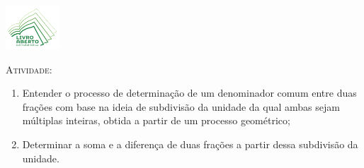 \documentclass[10 pt,usenames,dvipsnames, oneside]{article}
\begin{document}
\begin{center}
  \begin{minipage}[l]{3cm}
\includegraphics[width=2cm]{../../../Figuras/logo}       
\end{minipage}\hfill
\begin{minipage}[r]{.8\textwidth}
 {\Large \scshape Atividade: }  
\end{minipage}
\end{center}
\vspace{.2cm}

\ifdefined\prof
\begin{goals}
\begin{enumerate}
  \item     Entender o processo de determinação de um denominador comum entre duas frações com base na ideia de subdivisão da unidade da qual ambas sejam múltiplas inteiras, obtida a partir de um processo geométrico;
  \item     Determinar a soma e a diferença de duas frações a partir dessa subdivisão da unidade.
\end{enumerate}

\tcblower


\end{goals}
\end{document}
